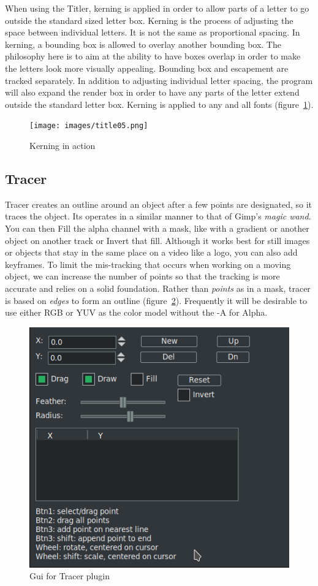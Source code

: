 {When using the Titler, kerning is applied in order to allow parts of a letter to go outside the standard sized letter box.  Kerning is the process of adjusting the space between individual letters.  It is not the same as proportional spacing.  In kerning, a bounding box is allowed to overlay another bounding box.  The philosophy here is to aim at the ability to have boxes overlap in order to make the letters look more visually appealing.  Bounding box and escapement are tracked separately.  In addition to adjusting individual letter spacing, the program will also expand the render box in order to have any parts of the letter extend outside the standard letter box.  Kerning is applied to any and all fonts (figure~\ref{fig:title05}).

\begin{figure}[hbtp]
    \centering
    \texttt{[image: images/title05.png]}
    \caption{Kerning in action}
    \label{fig:title05}
\end{figure}

\subsection{Tracer}%
\label{sub:tracer}

Tracer creates an outline around an object after a few points are designated, so it traces the object. Its operates in a similar manner to that of Gimp's \textit{magic wand}. You can then Fill the alpha channel with a mask, like with a gradient or another object on another track or Invert that fill. Although it works best for still images or objects that stay in the same place on a video like a logo, you can also add keyframes. To limit the mis-tracking that occurs when working on a moving object, we can increase the number of points so that the tracking is more accurate and relies on a solid foundation. Rather than \textit{points} as in a mask, tracer is based on \textit{edges} to form an outline (figure~\ref{fig:tracer-01}). Frequently it will be desirable to use either RGB or YUV as the color model without the -A for Alpha.

\begin{figure}[hbtp]
	\centering
	\includegraphics[width=0.55\linewidth]{images/tracer-01.png}
	\caption{Gui for Tracer plugin}
	\label{fig:tracer-01}
\end{figure}

}
